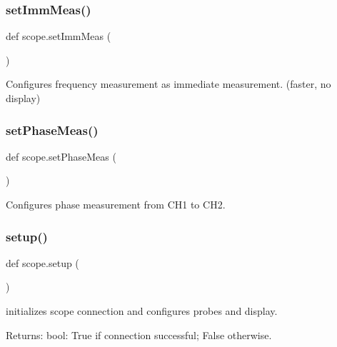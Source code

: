 \subsubsection{\texorpdfstring{set\+Imm\+Meas()}{setImmMeas()}}
{\footnotesize\ttfamily def scope.\+set\+Imm\+Meas (\begin{DoxyParamCaption}{ }\end{DoxyParamCaption})}

\begin{DoxyVerb}Configures frequency measurement as immediate measurement. (faster, no display)
\end{DoxyVerb}
 \mbox{\label{namespacescope_adec000df8052c67c9c8da426b44f410a}} 
\subsubsection{\texorpdfstring{set\+Phase\+Meas()}{setPhaseMeas()}}
{\footnotesize\ttfamily def scope.\+set\+Phase\+Meas (\begin{DoxyParamCaption}{ }\end{DoxyParamCaption})}

\begin{DoxyVerb}Configures phase measurement from CH1 to CH2.
\end{DoxyVerb}
 \mbox{\label{namespacescope_a09366c9a1818975b290d31e6f3d224ff}} 
\subsubsection{\texorpdfstring{setup()}{setup()}}
{\footnotesize\ttfamily def scope.\+setup (\begin{DoxyParamCaption}{ }\end{DoxyParamCaption})}

\begin{DoxyVerb}initializes scope connection and configures probes and display.

Returns:
    bool: True if connection successful; False otherwise.\end{DoxyVerb}
 \mbox{\label{namespacescope_ae9a76a589844597bfcde198348637c7e}} 
